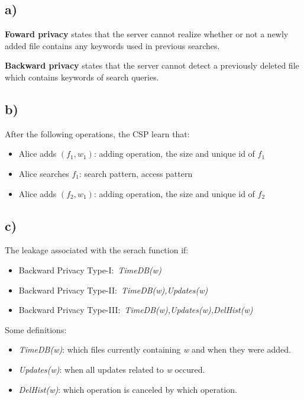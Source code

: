 \subsection*{a)}
%
\textbf{Foward privacy} states that the server cannot realize whether or not a newly added
file contains any keywords used in previous searches.

\textbf{Backward privacy} states that the server cannot detect a previously deleted file
which contains keywords of search queries.

\subsection*{b)}
%
After the following operations, the CSP learn that:
\begin{itemize}
    \item Alice adds \((f_1,w_1)\): adding operation, the size and unique id of \(f_1\)
    \item Alice searches \(f_1\): search pattern, access pattern
    \item Alice adds \((f_2,w_1)\): adding operation, the size and unique id of \(f_2\)
\end{itemize}

\subsection*{c)}
%
The leakage associated with the serach function if:
\begin{itemize}
    \item Backward Privacy Type-I:\ \emph{TimeDB(w)}
    \item Backward Privacy Type-II:\ \emph{TimeDB(w),Updates(w)}
    \item Backward Privacy Type-III:\ \emph{TimeDB(w),Updates(w),DelHist(w)}
\end{itemize}

Some definitions:
\begin{itemize}
    \item \emph{TimeDB(w)}: which files currently containing
    \emph{w} and when they were added.
    \item \emph{Updates(w)}: when all updates related to \emph{w} occured.
    \item \emph{DelHist(w)}: which operation is canceled by
    which operation.
\end{itemize}